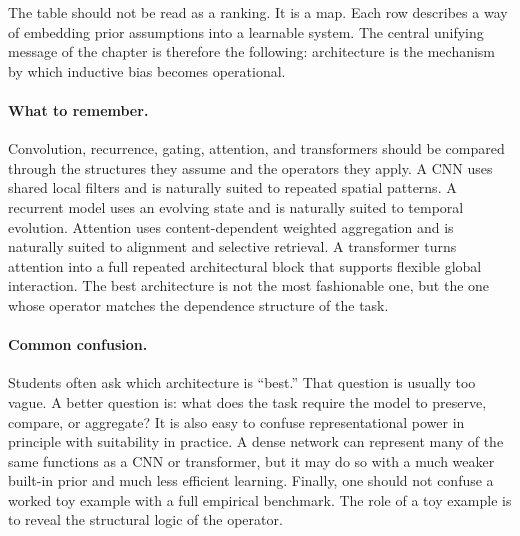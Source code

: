 The table should not be read as a ranking.
It is a map.
Each row describes a way of embedding prior assumptions into a learnable system.
The central unifying message of the chapter is therefore the following: architecture is the mechanism by which inductive bias becomes operational.

\paragraph{What to remember.}
Convolution, recurrence, gating, attention, and transformers should be compared through the structures they assume and the operators they apply.
A CNN uses shared local filters and is naturally suited to repeated spatial patterns.
A recurrent model uses an evolving state and is naturally suited to temporal evolution.
Attention uses content-dependent weighted aggregation and is naturally suited to alignment and selective retrieval.
A transformer turns attention into a full repeated architectural block that supports flexible global interaction.
The best architecture is not the most fashionable one, but the one whose operator matches the dependence structure of the task.

\paragraph{Common confusion.}
Students often ask which architecture is ``best.''
That question is usually too vague.
A better question is: what does the task require the model to preserve, compare, or aggregate?
It is also easy to confuse representational power in principle with suitability in practice.
A dense network can represent many of the same functions as a CNN or transformer, but it may do so with a much weaker built-in prior and much less efficient learning.
Finally, one should not confuse a worked toy example with a full empirical benchmark.
The role of a toy example is to reveal the structural logic of the operator.

